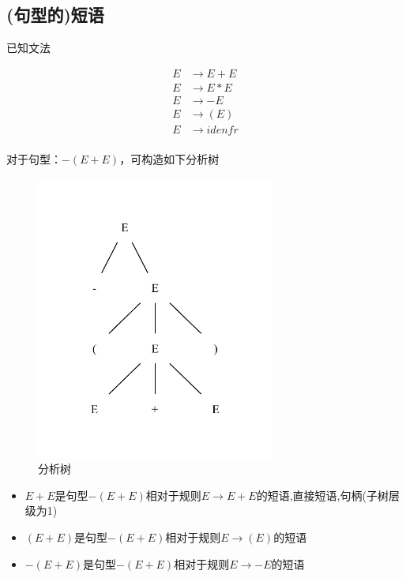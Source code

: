 \documentclass[UTF8]{ctexart} %
\begin{document}
\subsection{(句型的)短语}

已知文法

\begin{align*}
    E & \rightarrow E+E    \\
    E & \rightarrow E*E    \\
    E & \rightarrow -E     \\
    E & \rightarrow (E)    \\
    E & \rightarrow idenfr \\
\end{align*}

对于句型：$-(E+E)$，可构造如下分析树

\begin{figure}[H]
    \centering
    \includegraphics[width=0.7\textwidth]{assets/tree.pdf}
    \caption{分析树}
\end{figure}

\begin{itemize}
    \item $E+E$是句型$-(E+E)$相对于规则$E\rightarrow E+E$的短语,直接短语,句柄(子树层级为1)
    \item $(E+E)$是句型$-(E+E)$相对于规则$E\rightarrow (E)$的短语
    \item $-(E+E)$是句型$-(E+E)$相对于规则$E\rightarrow -E$的短语
\end{itemize}
\end{document}
